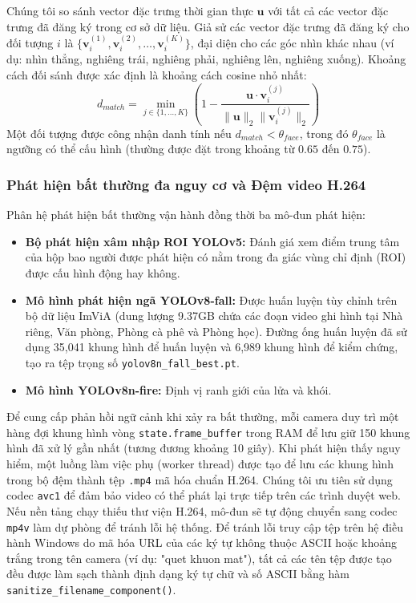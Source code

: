 \documentclass[12pt,a4paper]{article}
\begin{document}
Chúng tôi so sánh vector đặc trưng thời gian thực $\mathbf{u}$ với tất cả các vector đặc trưng đã đăng ký trong cơ sở dữ liệu. Giả sử các vector đặc trưng đã đăng ký cho đối tượng $i$ là $\{\mathbf{v}_i^{(1)}, \mathbf{v}_i^{(2)}, \dots, \mathbf{v}_i^{(K)}\}$, đại diện cho các góc nhìn khác nhau (ví dụ: nhìn thẳng, nghiêng trái, nghiêng phải, nghiêng lên, nghiêng xuống). Khoảng cách đối sánh được xác định là khoảng cách cosine nhỏ nhất:
\begin{equation}
    d_{match} = \min_{j \in \{1,\dots,K\}} \left( 1 - \frac{\mathbf{u} \cdot \mathbf{v}_i^{(j)}}{\|\mathbf{u}\|_2 \|\mathbf{v}_i^{(j)}\|_2} \right)
\end{equation}
Một đối tượng được công nhận danh tính nếu $d_{match} < \theta_{face}$, trong đó $\theta_{face}$ là ngưỡng có thể cấu hình (thường được đặt trong khoảng từ $0.65$ đến $0.75$).

\subsubsection*{Phát hiện bất thường đa nguy cơ và Đệm video H.264}
Phân hệ phát hiện bất thường vận hành đồng thời ba mô-đun phát hiện:
\begin{itemize}
    \item \textbf{Bộ phát hiện xâm nhập ROI YOLOv5:} Đánh giá xem điểm trung tâm của hộp bao người được phát hiện có nằm trong đa giác vùng chỉ định (ROI) được cấu hình động hay không.
    \item \textbf{Mô hình phát hiện ngã YOLOv8-fall:} Được huấn luyện tùy chỉnh trên bộ dữ liệu ImViA (dung lượng 9.37GB chứa các đoạn video ghi hình tại Nhà riêng, Văn phòng, Phòng cà phê và Phòng học). Đường ống huấn luyện đã sử dụng 35,041 khung hình để huấn luyện và 6,989 khung hình để kiểm chứng, tạo ra tệp trọng số \texttt{yolov8n\_fall\_best.pt}.
    \item \textbf{Mô hình YOLOv8n-fire:} Định vị ranh giới của lửa và khói.
\end{itemize}

Để cung cấp phản hồi ngữ cảnh khi xảy ra bất thường, mỗi camera duy trì một hàng đợi khung hình vòng \texttt{state.frame\_buffer} trong RAM để lưu giữ 150 khung hình đã xử lý gần nhất (tương đương khoảng 10 giây). Khi phát hiện thấy nguy hiểm, một luồng làm việc phụ (worker thread) được tạo để lưu các khung hình trong bộ đệm thành tệp \texttt{.mp4} mã hóa chuẩn H.264.
Chúng tôi ưu tiên sử dụng codec \texttt{avc1} để đảm bảo video có thể phát lại trực tiếp trên các trình duyệt web. Nếu nền tảng chạy thiếu thư viện H.264, mô-đun sẽ tự động chuyển sang codec \texttt{mp4v} làm dự phòng để tránh lỗi hệ thống.
Để tránh lỗi truy cập tệp trên hệ điều hành Windows do mã hóa URL của các ký tự không thuộc ASCII hoặc khoảng trắng trong tên camera (ví dụ: "quet khuon mat"), tất cả các tên tệp được tạo đều được làm sạch thành định dạng ký tự chữ và số ASCII bằng hàm \texttt{sanitize\_filename\_component()}.
\end{document}
